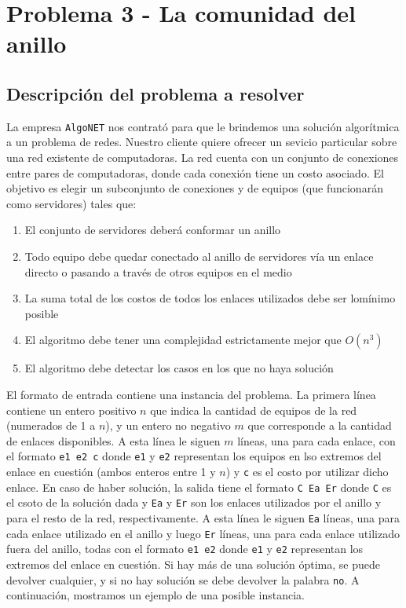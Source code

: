 \documentclass[11pt, a4paper, twoside]{article}
\begin{document}


\clearpage
\section{Problema 3 - La comunidad del anillo}

\subsection{Descripción del problema a resolver}
La empresa \texttt{AlgoNET} nos contrató para que le brindemos una 
solución algorítmica a un problema de redes. Nuestro cliente quiere ofrecer
un sevicio particular sobre una red existente de computadoras. La red cuenta
con un conjunto de conexiones entre pares de computadoras, donde cada 
conexión tiene un costo asociado. El objetivo es elegir un subconjunto de 
conexiones y de equipos (que funcionarán como servidores) tales que:
\begin{enumerate}
  \item El conjunto de servidores deberá conformar un anillo
  \item Todo equipo debe quedar conectado al anillo de servidores vía un 
        enlace directo o pasando a través de otros equipos en el medio
  \item La suma total de los costos de todos los enlaces utilizados debe
        ser lomínimo posible
  \item El algoritmo debe tener una complejidad estrictamente mejor que $O(n^3)$
  \item El algoritmo debe detectar los casos en los que no haya solución
\end{enumerate}

El formato de entrada contiene una instancia del problema. La primera línea 
contiene un entero positivo $n$ que indica la cantidad de equipos de la red
(numerados de 1 a $n$), y un entero no negativo $m$ que corresponde a la 
cantidad de enlaces disponibles. A esta línea le siguen $m$ líneas, una para
cada enlace, con el formato \texttt{e1 e2 c} donde \texttt{e1} y \texttt{e2}
representan los equipos en lso extremos del enlace en cuestión (ambos enteros
entre 1 y $n$) y \texttt{c} es el costo por utilizar dicho enlace. En caso de
haber solución, la salida tiene el formato \texttt{C Ea Er} donde \texttt{C} es
el csoto de la solución dada y \texttt{Ea} y \texttt{Er} son los enlaces 
utilizados por el anillo y para el resto de la red, respectivamente. A esta línea
le siguen \texttt{Ea} líneas, una para cada enlace utilizado en el anillo y luego
\texttt{Er} líneas, una para cada enlace utilizado fuera del anillo, todas con el 
formato \texttt{e1 e2} donde \texttt{e1} y \texttt{e2} representan los extremos
del enlace en cuestión. Si hay más de una solución óptima, se puede devolver 
cualquier, y si no hay solución se debe devolver la palabra \texttt{no}. A 
continuación, mostramos un ejemplo de una posible instancia.
\end{document}
